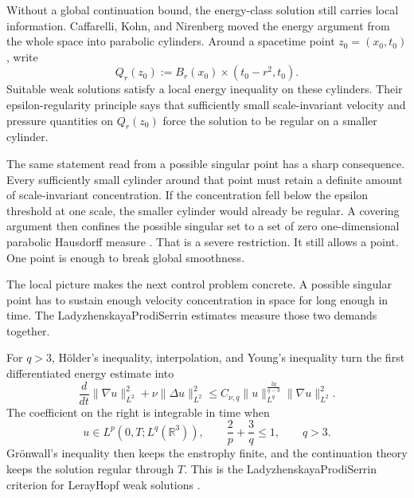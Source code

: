 
Without a global continuation bound, the energy-class solution still carries local information.
Caffarelli, Kohn, and Nirenberg moved the energy argument from the whole space into parabolic cylinders.
Around a spacetime point \(z_0=(x_0,t_0)\), write
\[
  Q_r(z_0)
  :=
  B_r(x_0)\times(t_0-r^2,t_0).
\]
Suitable weak solutions satisfy a local energy inequality on these cylinders.
Their epsilon-regularity principle says that sufficiently small scale-invariant velocity and pressure quantities on \(Q_r(z_0)\) force the solution to be regular on a smaller cylinder.

The same statement read from a possible singular point has a sharp consequence.
Every sufficiently small cylinder around that point must retain a definite amount of scale-invariant concentration.
If the concentration fell below the epsilon threshold at one scale, the smaller cylinder would already be regular.
A covering argument then confines the possible singular set to a set of zero one-dimensional parabolic Hausdorff measure \parencite{CaffarelliKohnNirenberg1982}.
That is a severe restriction.
It still allows a point.
One point is enough to break global smoothness.


The local picture makes the next control problem concrete.
A possible singular point has to sustain enough velocity concentration in space for long enough in time.
The Ladyzhenskaya\textendash Prodi\textendash Serrin estimates measure those two demands together.

For \(q>3\), H\"older's inequality, interpolation, and Young's inequality turn the first differentiated energy estimate into
\[
  \frac{d}{dt}\lVert\nabla u\rVert_{L^2}^{2}
  +\nu\lVert\Delta u\rVert_{L^2}^{2}
  \leq
  C_{\nu,q}\lVert u\rVert_{L^q}^{\frac{2q}{q-3}}
  \lVert\nabla u\rVert_{L^2}^{2}.
\]
The coefficient on the right is integrable in time when
\begin{equation}\label{eq:HistoricalLPSCriterion}
  u\in L^p(0,T;L^q(\mathbb R^3)),
  \qquad
  \frac{2}{p}+\frac{3}{q}\leq1,
  \qquad
  q>3.
\end{equation}
Gr\"onwall's inequality then keeps the enstrophy finite, and the continuation theory keeps the solution regular through \(T\).
This is the Ladyzhenskaya\textendash Prodi\textendash Serrin criterion for Leray\textendash Hopf weak solutions \parencite{Prodi1959,Serrin1963,Ladyzhenskaya1967}.

